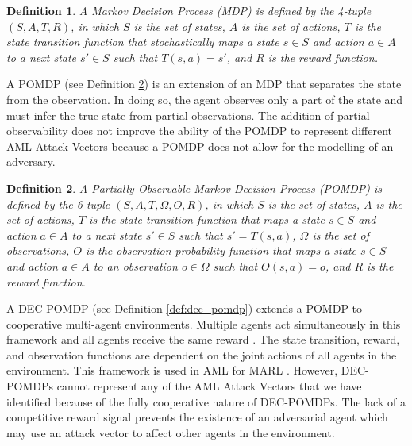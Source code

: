 \documentclass[conference,compsoc]{IEEEtran}
\newtheorem{definition}{Definition}
\begin{document}
\begin{definition}
A Markov Decision Process (MDP) is defined by the 4-tuple $(S, A, T, R)$, in which $S$ is the set of states, $A$ is the set of actions, $T$ is the state transition function that stochastically maps a state $s \in S$ and action $a \in A$ to a next state $s' \in S$ such that $T(s, a) = s'$, and $R$ is the reward function.
\label{def:mdp}
\end{definition}

A POMDP \cite{astrom_optimal_1965} (see  Definition \ref{def:pomdp}) is an extension of an MDP that separates the state from the observation. In doing so, the agent observes only a part of the state and must infer the true state from partial observations. The addition of partial observability does not improve the ability of the POMDP to represent different AML Attack Vectors because a POMDP does not allow for the modelling of an adversary.

\begin{definition}
A Partially Observable Markov Decision Process (POMDP) is defined by the 6-tuple $(S, A, T, \Omega, O, R)$, in which $S$ is the set of states, $A$ is the set of actions, $T$ is the state transition function that maps a state $s \in S$ and action $a \in A$ to a next state $s' \in S$ such that $s' = T(s, a)$, $\Omega$ is the set of observations, $O$ is the observation probability function that maps a state $s \in S$ and action $a \in A$ to an observation $o \in \Omega$ such that $O(s, a) = o$, and $R$ is the reward function.
\label{def:pomdp}
\end{definition}

A DEC-POMDP \cite{bernstein_complexity_2013} (see Definition \ref{def:dec_pomdp}) extends a POMDP to cooperative multi-agent environments. Multiple agents act simultaneously in this framework and all agents receive the same reward \cite{oliehoek_concise_2016}. The state transition, reward, and observation functions are dependent on the joint actions of all agents in the environment. This framework is used in AML for MARL \cite{blumenkamp_emergence_2021,lin_robustness_2020}. However, DEC-POMDPs cannot represent any of the AML Attack Vectors that we have identified because of the fully cooperative nature of DEC-POMDPs. The lack of a competitive reward signal prevents the existence of an adversarial agent which may use an attack vector to affect other agents in the environment.
\end{document}
